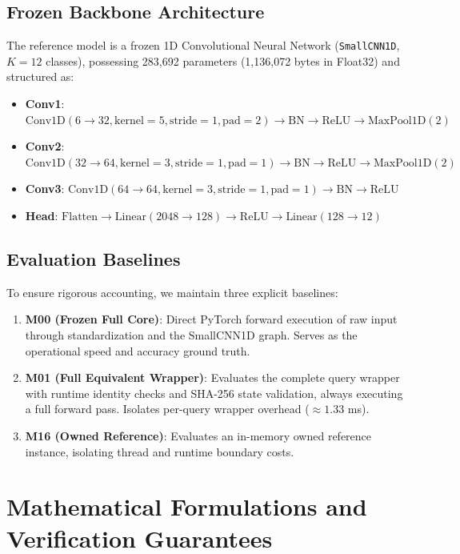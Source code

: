 \documentclass[10pt,twocolumn]{article}
\begin{document}
\subsection{Frozen Backbone Architecture}
The reference model is a frozen 1D Convolutional Neural Network (\texttt{SmallCNN1D}, $K=12$ classes), possessing 283,692 parameters (1,136,072 bytes in Float32) and structured as:
\begin{itemize}
    \item \textbf{Conv1}: $\text{Conv1D}(6 \to 32, \text{kernel}=5, \text{stride}=1, \text{pad}=2) \to \text{BN} \to \text{ReLU} \to \text{MaxPool1D}(2)$
    \item \textbf{Conv2}: $\text{Conv1D}(32 \to 64, \text{kernel}=3, \text{stride}=1, \text{pad}=1) \to \text{BN} \to \text{ReLU} \to \text{MaxPool1D}(2)$
    \item \textbf{Conv3}: $\text{Conv1D}(64 \to 64, \text{kernel}=3, \text{stride}=1, \text{pad}=1) \to \text{BN} \to \text{ReLU}$
    \item \textbf{Head}: $\text{Flatten} \to \text{Linear}(2048 \to 128) \to \text{ReLU} \to \text{Linear}(128 \to 12)$
\end{itemize}

\subsection{Evaluation Baselines}
To ensure rigorous accounting, we maintain three explicit baselines:
\begin{enumerate}
    \item \textbf{M00 (Frozen Full Core)}: Direct PyTorch forward execution of raw input through standardization and the SmallCNN1D graph. Serves as the operational speed and accuracy ground truth.
    \item \textbf{M01 (Full Equivalent Wrapper)}: Evaluates the complete query wrapper with runtime identity checks and SHA-256 state validation, always executing a full forward pass. Isolates per-query wrapper overhead ($\approx 1.33$ ms).
    \item \textbf{M16 (Owned Reference)}: Evaluates an in-memory owned reference instance, isolating thread and runtime boundary costs.
\end{enumerate}

\section{Mathematical Formulations and Verification Guarantees}
\end{document}
